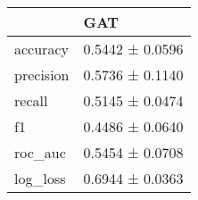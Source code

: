 \begin{tabular}{ll}
\toprule
 & GAT \\
\midrule
accuracy & 0.5442 ± 0.0596 \\
precision & 0.5736 ± 0.1140 \\
recall & 0.5145 ± 0.0474 \\
f1 & 0.4486 ± 0.0640 \\
roc_auc & 0.5454 ± 0.0708 \\
log_loss & 0.6944 ± 0.0363 \\
\bottomrule
\end{tabular}
